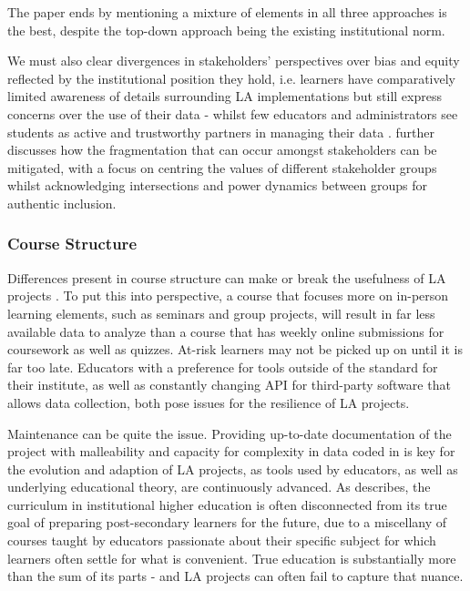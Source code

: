 \documentclass{l4proj}
\begin{document}
The paper ends by mentioning a mixture of elements in all three approaches is the best, despite the top-down approach being the existing institutional norm.

We must also clear divergences in stakeholders' perspectives over bias and equity reflected by the institutional position they hold, i.e. learners have comparatively limited awareness of details surrounding LA implementations but still express concerns over the use of their data - whilst few educators and administrators see students as active and trustworthy partners in managing their data \citep{Heiser2023AmplifyingEducation}. \citet{Heiser2023AmplifyingEducation} further discusses how the fragmentation that can occur amongst stakeholders can be mitigated, with a focus on centring the values of different stakeholder groups whilst acknowledging intersections and power dynamics between groups for authentic inclusion. 

\subsubsection{Course Structure}
\hfill

Differences present in course structure can make or break the usefulness of LA projects \citep{Azevedo2017LearningLearning, Barberà_Gregori_Galvan_Fernandez_Zhang_Fernández-Navarro_2017, Iglesias-Pradas2015AssessingCompetencies}. To put this into perspective, a course that focuses more on in-person learning elements, such as seminars and group projects, will result in far less available data to analyze than a course that has weekly online submissions for coursework as well as quizzes. At-risk learners may not be picked up on until it is far too late. Educators with a preference for tools outside of the standard for their institute, as well as constantly changing API for third-party software that allows data collection, both pose issues for the resilience of LA projects. 

Maintenance can be quite the issue. Providing up-to-date documentation of the project with malleability and capacity for complexity in data coded in is key for the evolution and adaption of LA projects, as tools used by educators, as well as underlying educational theory, are continuously advanced. As \citet{Zemsky_2014} describes, the curriculum in institutional higher education is often disconnected from its true goal of preparing post-secondary learners for the future, due to a miscellany of courses taught by educators passionate about their specific subject for which learners often settle for what is convenient. True education is substantially more than the sum of its parts - and LA projects can often fail to capture that nuance. 
\end{document}
